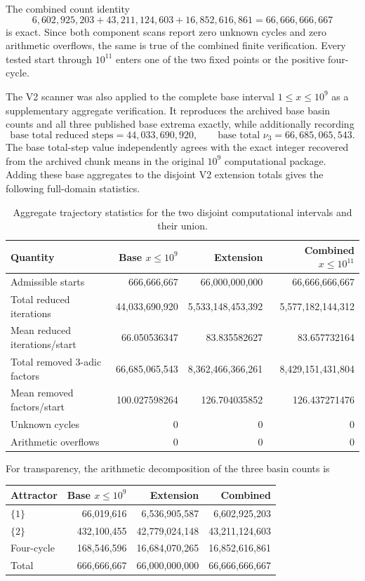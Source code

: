 \documentclass[11pt]{article}
\newcommand{\vthree}{\nu_3}
\begin{document}
The combined count identity
\[
6,602,925,203+43,211,124,603+16,852,616,861
=66,666,666,667
\]
is exact.  Since both component scans report zero unknown cycles and zero arithmetic overflows, the same is true of the combined finite verification.  Every tested start through $10^{11}$ enters one of the two fixed points or the positive four-cycle.


The V2 scanner was also applied to the complete base interval $1\le x\le10^9$ as a supplementary aggregate verification.  It reproduces the archived base basin counts and all three published base extrema exactly, while additionally recording
\[
\text{base total reduced steps}=44,033,690,920,
\qquad
\text{base total }\vthree=66,685,065,543.
\]
The base total-step value independently agrees with the exact integer recovered from the archived chunk means in the original $10^9$ computational package.  Adding these base aggregates to the disjoint V2 extension totals gives the following full-domain statistics.

\begin{table}[ht]
\centering
\small
\caption{Aggregate trajectory statistics for the two disjoint computational intervals and their union.}
\label{tab:aggregate}
\begin{tabular}{lrrr}
\toprule
Quantity & Base $x\le10^9$ & Extension & Combined $x\le10^{11}$\\
\midrule
Admissible starts & 666,666,667 & 66,000,000,000 & 66,666,666,667\\
Total reduced iterations & 44,033,690,920 & 5,533,148,453,392 & 5,577,182,144,312\\
Mean reduced iterations/start & 66.050536347 & 83.835582627 & 83.657732164\\
Total removed $3$-adic factors & 66,685,065,543 & 8,362,466,366,261 & 8,429,151,431,804\\
Mean removed factors/start & 100.027598264 & 126.704035852 & 126.437271476\\
Unknown cycles & 0 & 0 & 0\\
Arithmetic overflows & 0 & 0 & 0\\
\bottomrule
\end{tabular}
\end{table}

For transparency, the arithmetic decomposition of the three basin counts is
\begin{center}
\small
\begin{tabular}{lrrr}
\toprule
Attractor & Base $x\le10^9$ & Extension & Combined\\
\midrule
$\{1\}$ & 66,019,616 & 6,536,905,587 & 6,602,925,203\\
$\{2\}$ & 432,100,455 & 42,779,024,148 & 43,211,124,603\\
Four-cycle & 168,546,596 & 16,684,070,265 & 16,852,616,861\\
\midrule
Total & 666,666,667 & 66,000,000,000 & 66,666,666,667\\
\bottomrule
\end{tabular}
\end{center}
\end{document}
